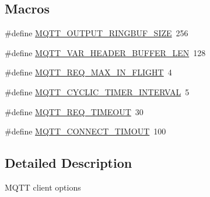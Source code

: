 \subsection*{Macros}
\begin{DoxyCompactItemize}
\item 
\#define \hyperlink{group__mqtt__opts_ga70627bafaffa071875cee9edc38d942b}{M\+Q\+T\+T\+\_\+\+O\+U\+T\+P\+U\+T\+\_\+\+R\+I\+N\+G\+B\+U\+F\+\_\+\+S\+I\+ZE}~256
\item 
\#define \hyperlink{group__mqtt__opts_ga8275ef78a85fb14c3ac1423c70e45805}{M\+Q\+T\+T\+\_\+\+V\+A\+R\+\_\+\+H\+E\+A\+D\+E\+R\+\_\+\+B\+U\+F\+F\+E\+R\+\_\+\+L\+EN}~128
\item 
\#define \hyperlink{group__mqtt__opts_gae82460b35de2291e9661e440c3458e8f}{M\+Q\+T\+T\+\_\+\+R\+E\+Q\+\_\+\+M\+A\+X\+\_\+\+I\+N\+\_\+\+F\+L\+I\+G\+HT}~4
\item 
\#define \hyperlink{group__mqtt__opts_ga1d89fda808c7047eab7a67d3785aea8e}{M\+Q\+T\+T\+\_\+\+C\+Y\+C\+L\+I\+C\+\_\+\+T\+I\+M\+E\+R\+\_\+\+I\+N\+T\+E\+R\+V\+AL}~5
\item 
\#define \hyperlink{group__mqtt__opts_ga262639f2b45f6e064fb53156396d6d0a}{M\+Q\+T\+T\+\_\+\+R\+E\+Q\+\_\+\+T\+I\+M\+E\+O\+UT}~30
\item 
\#define \hyperlink{group__mqtt__opts_gac5d0580d1caf57dac1cb56662e5d9f7b}{M\+Q\+T\+T\+\_\+\+C\+O\+N\+N\+E\+C\+T\+\_\+\+T\+I\+M\+O\+UT}~100
\end{DoxyCompactItemize}


\subsection{Detailed Description}
M\+Q\+TT client options 
